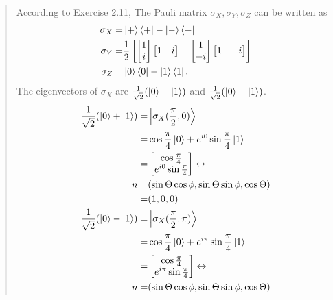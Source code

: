 \documentclass[UTF8]{ctexart}
\begin{document}
\begin{quote}
According to Exercise 2.11, The Pauli matrix $\sigma_{X},\sigma_{Y},\sigma_{Z}$ can be written as \\
\begin{equation}
	\begin{aligned}
		\sigma_{X}=&\ket{+}\bra{+}-\ket{-}\bra{-}\\
	\sigma_{Y}=&\frac{1}{2}\left[\begin{bmatrix}1\\i\end{bmatrix}\begin{bmatrix}1 &i\end{bmatrix}
	-\begin{bmatrix}1\\-i\end{bmatrix}\begin{bmatrix}1&-i\end{bmatrix}
		\right]\\
		\sigma_{Z}=&\ket{0}\bra{0}-\ket{1}\bra{1}.\\
	\end{aligned}
\end{equation}
The eigenvectors of $\sigma_{X}$ are $\frac{1}{\sqrt{2}}(\ket{0}+\ket{1})$ and $\frac{1}{\sqrt{2}}(\ket{0}-\ket{1})$.
\\
\begin{equation}
	\begin{aligned}
		\frac{1}{\sqrt{2}}(\ket{0}+\ket{1})=&\ket{\sigma_{X}(\frac{\pi}{2},0)}\\
		=&\cos{\frac{\pi}{4}}\ket{0}+e^{i0}\sin{\frac{\pi}{4}}\ket{1}  \\
		=&\begin{bmatrix}
			\cos{\frac{\pi}{4}} \\ e^{i0}\sin{\frac{\pi}{4}}
		\end{bmatrix} \leftrightarrow \\
		n=&(\sin{\Theta}\cos{\phi},\sin{\Theta}\sin{\phi},\cos{\Theta})\\
		 =&(1,0,0)\\
		 \frac{1}{\sqrt{2}}(\ket{0}-\ket{1})=&\ket{\sigma_{X}(\frac{\pi}{2},\pi)}\\
		=&\cos{\frac{\pi}{4}}\ket{0}+e^{i\pi}\sin{\frac{\pi}{4}}\ket{1}  \\
		=&\begin{bmatrix}
			\cos{\frac{\pi}{4}} \\ e^{i\pi}\sin{\frac{\pi}{4}}
		\end{bmatrix} \leftrightarrow \\
		n=&(\sin{\Theta}\cos{\phi},\sin{\Theta}\sin{\phi},\cos{\Theta})\\

\end{aligned}
\end{equation}
\end{quote}
\end{document}

